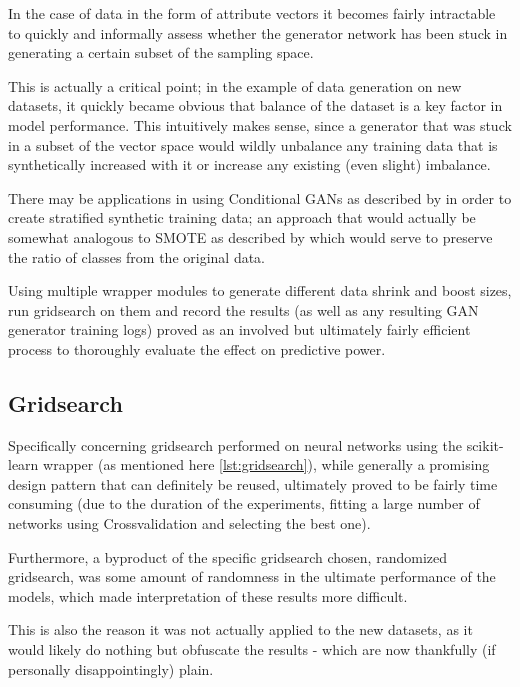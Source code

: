 In the case of data in the form of attribute vectors it becomes fairly intractable to quickly and informally assess whether the generator network has been stuck in generating a certain subset of the sampling space.

This is actually a critical point; in the example of data generation on new datasets, it quickly became obvious that balance of the dataset is a key factor in model performance. This intuitively makes sense, since a generator that was stuck in a subset of the vector space would wildly unbalance any training data that is synthetically increased with it or increase any existing (even slight) imbalance.

There may be applications in using Conditional \acp{GAN} as described by \cite{conditional_gans} in order to create stratified synthetic training data; an approach that would actually be somewhat analogous to \ac{SMOTE} as described by \cite{smote} which would serve to preserve the ratio of classes from the original data.

Using multiple wrapper modules to generate different data shrink and boost sizes, run gridsearch on them and record the results (as well as any resulting \ac{GAN} generator training logs) proved as an involved but ultimately fairly efficient process to thoroughly evaluate the effect on predictive power.

\pagebreak

\subsection{Gridsearch}

Specifically concerning gridsearch performed on neural networks using the scikit-learn wrapper (as mentioned here \ref{lst:gridsearch}), while generally a promising design pattern that can definitely be reused, ultimately proved to be fairly time consuming (due to the duration of the experiments, fitting a large number of networks using Crossvalidation and selecting the best one). 

Furthermore, a byproduct of the specific gridsearch chosen, randomized gridsearch, was some amount of randomness in the ultimate performance of the models, which made interpretation of these results more difficult. 

This is also the reason it was not actually applied to the new datasets, as it would likely do nothing but obfuscate the results - which are now thankfully (if personally disappointingly) plain.

